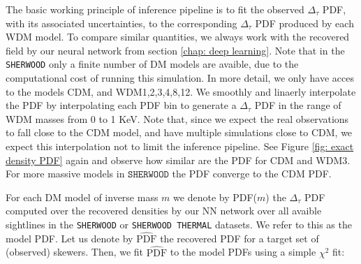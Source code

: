 The basic working principle of inference pipeline is to fit the observed $\Delta_\tau$ PDF, with its associated uncertainties, to the corresponding $\Delta_\tau$ PDF produced by each WDM model. To compare similar quantities, we always work with the recovered field by our neural network from section \ref{chap: deep learning}. Note that in the \texttt{SHERWOOD} only a finite number of DM models are avaible, due to the computational cost of running this simulation. In more detail, we only have acces to the models CDM, and WDM1,2,3,4,8,12. We smoothly and linaerly interpolate the PDF by interpolating each PDF bin to generate a $\Delta_\tau$ PDF in the range of WDM masses from 0 to 1 KeV. Note that, since we expect the real observations to fall close to the CDM model, and have multiple simulations close to CDM, we expect this interpolation not to limit the inference pipeline. See Figure \ref{fig: exact density PDF} again and observe how similar are the PDF for CDM and WDM3. For more massive models in $\texttt{SHERWOOD}$ the PDF converge to the CDM PDF.

For each DM model of inverse mass $m$ we denote by PDF($m$)  the $\Delta_\tau$ PDF computed over the recovered densities by our NN network over all avaible sightlines in the \texttt{SHERWOOD} or \texttt{SHERWOOD THERMAL} datasets. We refer to this as the model PDF. Let us denote by $\widehat{\text{PDF}}$ the recovered PDF for a target set of (observed) skewers. Then, we fit $\hat{\text{PDF}}$ to the model PDFs using a simple $\chi^2$ fit:

